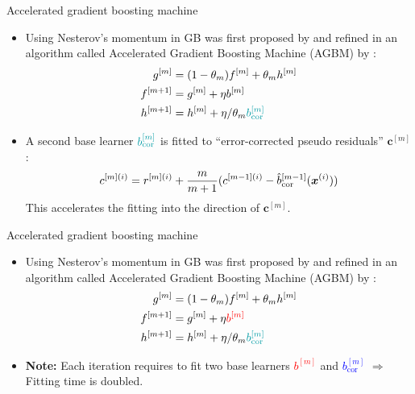 \documentclass[t,10pt]{beamer}
\begin{document}
\begin{frame}{Accelerated gradient boosting machine}
  \begin{itemize}
    \item
      Using Nesterov's momentum in GB was first proposed by \cite{biau2019accelerated} and refined in an algorithm called Accelerated Gradient Boosting Machine (AGBM) by \cite{lu2020accelerating}:
      \begin{align*}
      g^{[m]} &= (1 - \theta_m) f^{[m]} + \theta_m h^{[m]}\\
      f^{[m+1]} &=g^{[m]} + \eta b^{[m]} \\
      h^{[m+1]} &= h^{[m]} + \eta / \theta_m \textcolor{blue}{b^{[m]}_{\text{cor}}}
      \end{align*}
    \item
      A second base learner $\textcolor{blue}{b^{[m]}_{\text{cor}}}$ is fitted to \enquote{error-corrected pseudo residuals} $\bm{c}^{[m]}$:
      \[c^{[m](i)} = r^{[m](i)} + \frac{m}{m+1}(c^{[m-1](i)} - \hat{b}_{\text{cor}}^{[m-1]}(\bm{x}^{(i)}))\]
      This accelerates the fitting into the direction of $\bm{c}^{[m]}$.
  \end{itemize}
  \addtocounter{framenumber}{-1}
\end{frame}

\begin{frame}{Accelerated gradient boosting machine}
  \begin{itemize}
    \item
      Using Nesterov's momentum in GB was first proposed by \cite{biau2019accelerated} and refined in an algorithm called Accelerated Gradient Boosting Machine (AGBM) by \cite{lu2020accelerating}:
      \begin{align*}
      g^{[m]} &= (1 - \theta_m) f^{[m]} + \theta_m h^{[m]}\\
      f^{[m+1]} &=g^{[m]} + \eta \textcolor{red}{b^{[m]}} \\
      h^{[m+1]} &= h^{[m]} + \eta / \theta_m \textcolor{blue}{b^{[m]}_{\text{cor}}}
      \end{align*}
    \item
      \textbf{Note:} Each iteration requires to fit two base learners \textcolor{red}{$b^{[m]}$} and \textcolor{blue}{$b^{[m]}_{\text{cor}}$} $\Rightarrow$ Fitting time is doubled.
  \end{itemize}
  \addtocounter{framenumber}{-1}
\end{frame}
\end{document}
